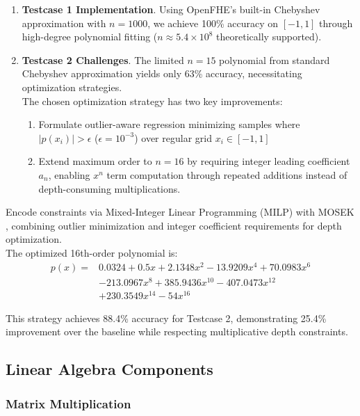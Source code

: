 \documentclass[article]{iacrtrans}
\begin{document}
\begin{enumerate}
    \item \textbf{Testcase 1 Implementation}. Using OpenFHE's built-in Chebyshev approximation with $n=1000$, we achieve 100\% accuracy on $[-1,1]$ through high-degree polynomial fitting ($n \approx 5.4\times10^8$ theoretically supported).
    
    \item \textbf{Testcase 2 Challenges}. The limited $n=15$ polynomial from standard Chebyshev approximation yields only 63\% accuracy, necessitating optimization strategies.\\
    The chosen optimization strategy has two key improvements: 
        \begin{enumerate}
            \item Formulate outlier-aware regression minimizing samples where $|p(x_i)| > \epsilon$ ($\epsilon=10^{-3}$) over regular grid $x_i \in [-1,1]$
            \item Extend maximum order to $n=16$ by requiring integer leading coefficient $a_n$, enabling $x^n$ term computation through repeated additions instead of depth-consuming multiplications.
        \end{enumerate}
\end{enumerate}

Encode constraints via Mixed-Integer Linear Programming (MILP) with MOSEK \cite{MOSEK2024}, combining outlier minimization and integer coefficient requirements for depth optimization.\\
The optimized 16th-order polynomial is:
\begin{align*}
p(x) = & 0.0324 + 0.5x + 2.1348x^2 -13.9209x^4 +70.0983x^6 \\
       & -213.0967x^8 +385.9436x^{10} -407.0473x^{12} \\
       & +230.3549x^{14} -54x^{16}
\end{align*}

This strategy achieves 88.4\% accuracy for Testcase 2, demonstrating 25.4\% improvement over the baseline while respecting multiplicative depth constraints.




\subsection{Linear Algebra Components}


\subsubsection{Matrix Multiplication}
\end{document}

